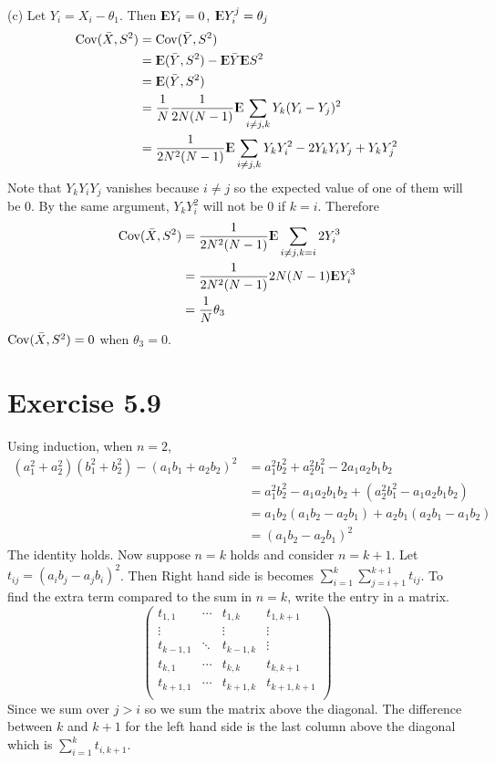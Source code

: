 \documentclass[12pt]{article}
\begin{document}
(c)
 Let $Y_i = X_i - \theta_1$. Then ${\rm I\kern-.3em E} Y_i = 0$, ${\rm I\kern-.3em E} Y_i^j = \theta_j$
 $$\begin{aligned}
	\mathrm{Cov}(\bar{X}, S^2) &= \mathrm{Cov}(\bar{Y}, S^2) \\
	 &= {\rm I\kern-.3em E}(\bar{Y}, S^2) - {\rm I\kern-.3em E} \bar{Y} {\rm I\kern-.3em E} S^2 \\
	 &= {\rm I\kern-.3em E}(\bar{Y}, S^2) \\
	 &= \frac{1}{N} \frac{1}{2N(N-1)} {\rm I\kern-.3em E} \sum_{i\neq j, k} Y_k (Y_i - Y_j)^2 \\
	 &= \frac{1}{2N^2(N-1)} {\rm I\kern-.3em E} \sum_{i\neq j, k} Y_kY_i^2 - 2Y_k Y_iY_j + Y_k Y_j^2 \\
\end{aligned}$$
Note that $Y_k Y_iY_j$ vanishes because $i \neq j$ so the expected value of one of them will be 0. By the same argument,  $Y_kY_i^2$ will not be 0 if $k=i$. Therefore 
 $$\begin{aligned}
	\mathrm{Cov}(\bar{X}, S^2) &=\frac{1}{2N^2(N-1)} {\rm I\kern-.3em E} \sum_{i\neq j, k=i} 2 Y_i^3 \\
	&= \frac{1}{2N^2(N-1)} 2N(N-1) {\rm I\kern-.3em E} Y_i^3 \\
	&= \frac{1}{N } \theta_3 \\
\end{aligned}$$
$\mathrm{Cov}(\bar{X}, S^2) = 0 $ when $\theta_3 = 0$.
\QED

\section*{Exercise 5.9}
Using induction, when $n = 2$, 
$$ \begin{aligned}
	(a_1^2 + a_2^2)(b_1^2+b_2^2) - (a_1b_1+a_2b_2)^2 &= a_1^2b_2^2 + a_2^2b_1^2 - 2a_1a_2b_1b_2 \\ 
	&= a_1^2b_2^2 -  a_1a_2b_1b_2  + ( a_2^2b_1^2 - a_1a_2b_1b_2) \\
	&= a_1b_2(a_1b_2 - a_2b_1) + a_2b_1(a_2b_1 - a_1b_2) \\
	&= (a_1b_2 - a_2b_1)^2 
\end{aligned}$$
The identity holds. Now suppose $n=k$ holds and consider $n=k+1$. Let $t_{ij} = (a_ib_j - a_jb_i)^2$. Then Right hand side is becomes $\sum_{i=1}^{k}\sum_{j=i+1}^{k+1} t_{ij}$. To find the extra term compared to the sum in $n=k$, write the entry in a matrix.
$$
\begin{pmatrix}
	t_{1,1} & \cdots & t_{1, k} & t_{1, k+1}\\
	\vdots &    & \vdots & \vdots \\
	t_{k-1, 1} &  \ddots  & t_{k-1, k} & \vdots \\
	t_{k, 1} &  \cdots  & t_{k,k}  & t_{k, k+1}\\
	t_{k+1, 1} &  \cdots  & t_{k+1,k}  & t_{k+1, k+1}\\
\end{pmatrix}
$$
Since we sum over $j > i$ so we sum the matrix above the diagonal. The difference between $k$ and $k+1$ for the left hand side is the last column above the diagonal which is $\sum_{i=1}^{k} t_{i, k+1}$. 
\end{document}
